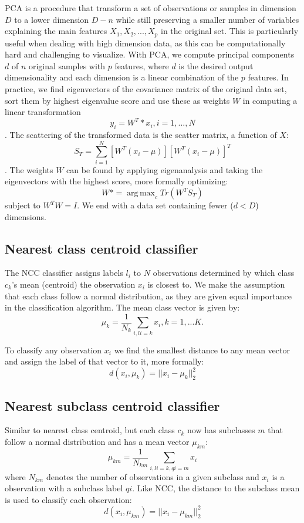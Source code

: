 \documentclass[journal]{IEEEtran}
\DeclareMathOperator*{\argmax}{arg\,max}
\begin{document}
PCA is a procedure that transform a set of observations or samples in dimension $D$ to a lower dimension $D-n$ while still preserving a smaller number of variables explaining the main features $X_{1}, X_{2}, ..., X_{p}$ in the original set. This is particularly useful when dealing with high dimension data, as this can be computationally hard and challenging to visualize. With PCA, we compute principal components $d$ of $n$ original samples with $p$ features, where $d$ is the desired output dimensionality and each dimension is a linear combination of the $p$ features. In practice, we find eigenvectors of the covariance matrix of the original data set, sort them by highest eigenvalue score and use these as weights $W$ in computing a linear transformation $$y_{i} = W^T*x_{i}, i = 1, ..., N$$. The scattering of the transformed data is the scatter matrix, a function of $X$: $$S_{T} = \sum_{i=1}^{N} [W^T(x_{i}-\mu)][W^T(x_{i}-\mu)]^T$$. The weights $W$ can be found by applying eigenanalysis and taking the eigenvectors with the  highest score, more formally optimizing: \[ W* = \argmax_c Tr (W^TS_{T}) \] subject to $ W^TW=I$. We end with a data set containing fewer ($d < D$) dimensions.

\subsection{Nearest class centroid classifier}

The NCC classifier assigns labels $l_{i}$ to $N$ observations determined by which class $c_{k}$'s mean (centroid) the observation $x_{i}$ is closest to. We make the assumption that each class follow a normal distribution, as they are given equal importance in the classification algorithm. The mean class vector is given by: $$ \mu_{k} = \frac{1}{N_{k}} \sum_{i,li=k}^{} x_{i}, k = 1, ... K. $$

To classify any observation $x_{i}$ we find the smallest distance to any mean vector and assign the label of that vector to it, more formally: $$ d(x_{i},\mu_{k}) = ||x_{i}-\mu_{k}||^2_{2} $$

\subsection{Nearest subclass centroid classifier}

Similar to nearest class centroid, but each class $c_{k}$ now has subclasses $m$ that follow a normal distribution and has a mean vector $\mu_{km}$: $$ \mu_{km} = \frac{1}{N_{km}} \sum_{i,li=k, qi=m}^{} x_{i} $$ where $N_{km}$ denotes the number of observations in a given subclass and $x_{i}$ is a observation with a subclass label $qi$. Like NCC, the distance to the subclass mean is used to classify each observation: $$ d(x_{i},\mu_{km}) = ||x_{i}-\mu_{km}||^2_{2} $$
\end{document}
